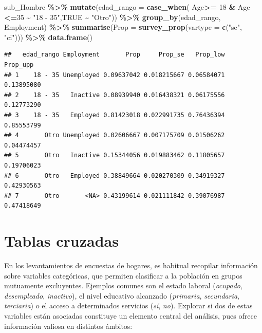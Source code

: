 \documentclass[
  12pt,
]{book}
\newenvironment{Shaded}{\begin{snugshade}}{\end{snugshade}}
\newcommand{\AttributeTok}[1]{\textcolor[rgb]{0.13,0.29,0.53}{#1}}
\newcommand{\ConstantTok}[1]{\textcolor[rgb]{0.56,0.35,0.01}{#1}}
\newcommand{\DecValTok}[1]{\textcolor[rgb]{0.00,0.00,0.81}{#1}}
\newcommand{\FunctionTok}[1]{\textcolor[rgb]{0.13,0.29,0.53}{\textbf{#1}}}
\newcommand{\NormalTok}[1]{#1}
\newcommand{\SpecialCharTok}[1]{\textcolor[rgb]{0.81,0.36,0.00}{\textbf{#1}}}
\newcommand{\StringTok}[1]{\textcolor[rgb]{0.31,0.60,0.02}{#1}}
\begin{document}
\begin{Shaded}
\begin{Highlighting}[]
\NormalTok{sub\_Hombre }\SpecialCharTok{\%\textgreater{}\%} \FunctionTok{mutate}\NormalTok{(}\AttributeTok{edad\_rango =} \FunctionTok{case\_when}\NormalTok{(}
\NormalTok{                      Age}\SpecialCharTok{\textgreater{}=} \DecValTok{18} \SpecialCharTok{\&}\NormalTok{ Age }\SpecialCharTok{\textless{}=}\DecValTok{35}  \SpecialCharTok{\textasciitilde{}} \StringTok{"18 {-} 35"}\NormalTok{,}\ConstantTok{TRUE} \SpecialCharTok{\textasciitilde{}} \StringTok{"Otro"}\NormalTok{)) }\SpecialCharTok{\%\textgreater{}\%}
                      \FunctionTok{group\_by}\NormalTok{(edad\_rango, Employment) }\SpecialCharTok{\%\textgreater{}\%} 
                      \FunctionTok{summarise}\NormalTok{(}\AttributeTok{Prop =} \FunctionTok{survey\_prop}\NormalTok{(}\AttributeTok{vartype =}  \FunctionTok{c}\NormalTok{(}\StringTok{"se"}\NormalTok{, }\StringTok{"ci"}\NormalTok{))) }\SpecialCharTok{\%\textgreater{}\%} 
                      \FunctionTok{data.frame}\NormalTok{()}
\end{Highlighting}
\end{Shaded}

\begin{verbatim}
##   edad_rango Employment       Prop     Prop_se   Prop_low   Prop_upp
## 1    18 - 35 Unemployed 0.09637042 0.018215667 0.06584071 0.13895080
## 2    18 - 35   Inactive 0.08939940 0.016438321 0.06175556 0.12773290
## 3    18 - 35   Employed 0.81423018 0.022991735 0.76436394 0.85553799
## 4       Otro Unemployed 0.02606667 0.007175709 0.01506262 0.04474457
## 5       Otro   Inactive 0.15344056 0.019883462 0.11805657 0.19706023
## 6       Otro   Employed 0.38849664 0.020270309 0.34919327 0.42930563
## 7       Otro       <NA> 0.43199614 0.021111842 0.39076987 0.47418649
\end{verbatim}

\section{Tablas cruzadas}\label{tablas-cruzadas}

En los levantamientos de encuestas de hogares, es habitual recopilar información sobre variables categóricas, que permiten clasificar a la población en grupos mutuamente excluyentes. Ejemplos comunes son el estado laboral (\emph{ocupado}, \emph{desempleado}, \emph{inactivo}), el nivel educativo alcanzado (\emph{primaria}, \emph{secundaria}, \emph{terciaria}) o el acceso a determinados servicios (\emph{sí}, \emph{no}). Explorar si dos de estas variables están asociadas constituye un elemento central del análisis, pues ofrece información valiosa en distintos ámbitos:
\end{document}
